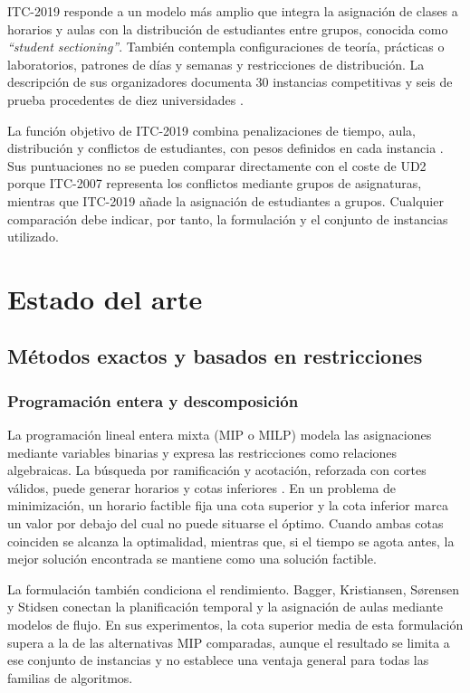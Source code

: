 \documentclass[journal]{IEEEtran}
\begin{document}
ITC-2019 responde a un modelo más amplio que integra la asignación de clases a horarios y aulas con la distribución de estudiantes entre grupos, conocida como \textit{``student sectioning''}. También contempla configuraciones de teoría, prácticas o laboratorios, patrones de días y semanas y restricciones de distribución. La descripción de sus organizadores documenta 30 instancias competitivas y seis de prueba procedentes de diez universidades \cite{ref5}.


La función objetivo de ITC-2019 combina penalizaciones de tiempo, aula, distribución y conflictos de estudiantes, con pesos definidos en cada instancia \cite{ref5}. Sus puntuaciones no se pueden comparar directamente con el coste de UD2 porque ITC-2007 representa los conflictos mediante grupos de asignaturas, mientras que ITC-2019 añade la asignación de estudiantes a grupos. Cualquier comparación debe indicar, por tanto, la formulación y el conjunto de instancias utilizado.


\section{Estado del arte}

\subsection{Métodos exactos y basados en restricciones}

\subsubsection{Programación entera y descomposición}

La programación lineal entera mixta (MIP o MILP) modela las asignaciones mediante variables binarias y expresa las restricciones como relaciones algebraicas. La búsqueda por ramificación y acotación, reforzada con cortes válidos, puede generar horarios y cotas inferiores \cite{ref3}. En un problema de minimización, un horario factible fija una cota superior y la cota inferior marca un valor por debajo del cual no puede situarse el óptimo. Cuando ambas cotas coinciden se alcanza la optimalidad, mientras que, si el tiempo se agota antes, la mejor solución encontrada se mantiene como una solución factible.


La formulación también condiciona el rendimiento. Bagger, Kristiansen, Sørensen y Stidsen \cite{ref6} conectan la planificación temporal y la asignación de aulas mediante modelos de flujo. En sus experimentos, la cota superior media de esta formulación supera a la de las alternativas MIP comparadas, aunque el resultado se limita a ese conjunto de instancias y no establece una ventaja general para todas las familias de algoritmos.
\end{document}

